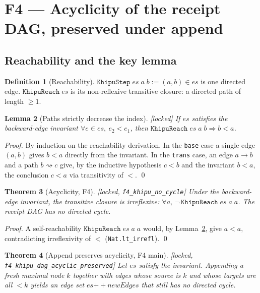 \documentclass[11pt,letterpaper]{article}
\newtheorem{theorem}{Theorem}[section]
\newtheorem{lemma}[theorem]{Lemma}
\theoremstyle{definition}
\newtheorem{definition}[theorem]{Definition}
\begin{document}
\section{F4 --- Acyclicity of the receipt DAG, preserved under append}\label{sec:f4}

\subsection{Reachability and the key lemma}

\begin{definition}[Reachability]
$\texttt{KhipuStep}\;es\;a\;b := (a,b)\in es$ is one directed edge.
$\texttt{KhipuReach}\;es$ is its non-reflexive transitive closure: a directed
path of length $\geq 1$.
\end{definition}

\begin{lemma}[Paths strictly decrease the index]\label{lem:decrease}
\emph{[locked]} If $es$ satisfies the backward-edge invariant
$\forall e \in es,\ e_2 < e_1$, then $\texttt{KhipuReach}\;es\;a\;b
\Rightarrow b < a$.
\end{lemma}

\begin{proof}
By induction on the reachability derivation. In the \texttt{base} case a single
edge $(a,b)$ gives $b < a$ directly from the invariant. In the \texttt{trans}
case, an edge $a\to b$ and a path $b\rightsquigarrow c$ give, by the inductive
hypothesis $c < b$ and the invariant $b < a$, the conclusion $c < a$ via
transitivity of $<$. \qed
\end{proof}

\begin{theorem}[Acyclicity, F4]\label{thm:f4-acyclic}
\emph{[locked, \texttt{f4\_khipu\_no\_cycle}]} Under the backward-edge invariant,
the transitive closure is irreflexive: $\forall a,\ \neg\,
\texttt{KhipuReach}\;es\;a\;a$. The receipt DAG has no directed cycle.
\end{theorem}

\begin{proof}
A self-reachability $\texttt{KhipuReach}\;es\;a\;a$ would, by
Lemma~\ref{lem:decrease}, give $a < a$, contradicting irreflexivity of $<$
(\texttt{Nat.lt\_irrefl}). \qed
\end{proof}

\begin{theorem}[Append preserves acyclicity, F4 main]\label{thm:f4-append}
\emph{[locked, \nolinkurl{f4_khipu_dag_acyclic_preserved}]} Let $es$ satisfy the
invariant. Appending a fresh maximal node $k$ together with edges whose source is
$k$ and whose targets are all $< k$ yields an edge set $es \mathbin{+\!\!+}
\mathit{newEdges}$ that still has no directed cycle.
\end{theorem}
\end{document}
